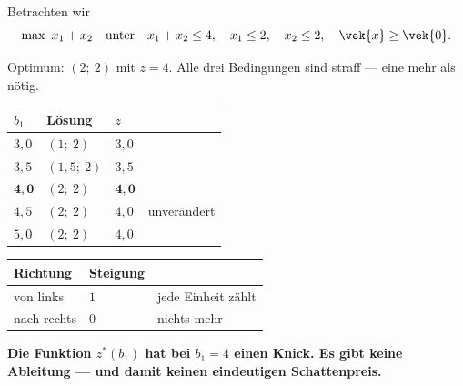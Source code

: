 \begin{warnung}
Betrachten wir
\[ \max\ x_1+x_2 \quad\text{unter}\quad x_1+x_2 \le 4,\quad x_1 \le 2,\quad x_2 \le 2,\quad \vek{x}\ge\vek{0} . \]

Optimum: $(2;\ 2)$ mit $z = 4$. Alle drei Bedingungen sind straff --- eine mehr als nötig.

\begin{center}
{\small
\renewcommand{\arraystretch}{1.48}
\begin{tabular}{@{}P{1.6cm}P{2.0cm}P{1.8cm}P{2.4cm}@{}}
\toprule
$b_1$ & \textbf{Lösung} & $z$ & \\
\midrule
$3{,}0$ & $(1;\ 2)$ & $3{,}0$ & \\
$3{,}5$ & $(1{,}5;\ 2)$ & $3{,}5$ & \\
$\mathbf{4{,}0}$ & $(2;\ 2)$ & $\mathbf{4{,}0}$ & \\
$4{,}5$ & $(2;\ 2)$ & $4{,}0$ & \textcolor{akzent}{unverändert}\\
$5{,}0$ & $(2;\ 2)$ & $4{,}0$ & \\
\bottomrule
\end{tabular}}
\end{center}

\begin{center}
\renewcommand{\arraystretch}{1.5}
\begin{tabular}{@{}P{2.8cm}P{2.4cm}P{2.6cm}@{}}
\toprule
\textbf{Richtung} & \textbf{Steigung} & \\
\midrule
von links & $1$ & jede Einheit zählt\\
nach rechts & $0$ & nichts mehr\\
\bottomrule
\end{tabular}
\end{center}

\begin{center}
\begin{minipage}{0.9\textwidth}
\textbf{Die Funktion $z^{*}(b_1)$ hat bei $b_1=4$ einen Knick. Es gibt keine Ableitung --- und damit keinen eindeutigen Schattenpreis.}
\end{minipage}
\end{center}

\begin{center}
\end{center}
\end{warnung}

